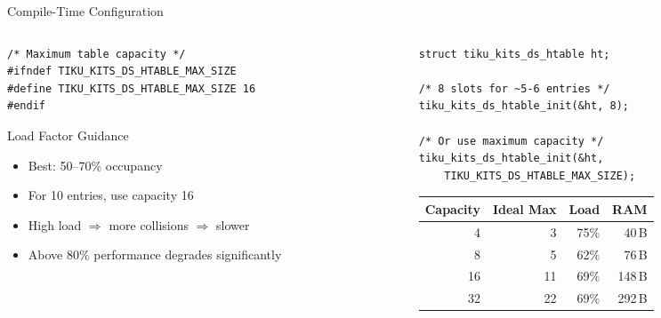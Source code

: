 \documentclass[aspectratio=169, 10pt]{beamer}
\begin{document}
\begin{frame}[fragile]{Compile-Time Configuration}
\begin{columns}[T]
\begin{column}{0.48\textwidth}
\begin{lstlisting}[style=cstyle,
  title={Configurable parameters}]
/* Maximum table capacity */
#ifndef TIKU_KITS_DS_HTABLE_MAX_SIZE
#define TIKU_KITS_DS_HTABLE_MAX_SIZE 16
#endif
\end{lstlisting}

\vspace{0.3em}
\begin{block}{Load Factor Guidance}
\begin{itemize}
  \item Best: 50--70\% occupancy
  \item For 10 entries, use capacity 16
  \item High load $\Rightarrow$ more collisions $\Rightarrow$ slower
  \item Above 80\% performance degrades significantly
\end{itemize}
\end{block}
\end{column}

\begin{column}{0.48\textwidth}
\begin{lstlisting}[style=cstyle,
  title={Runtime initialization}]
struct tiku_kits_ds_htable ht;

/* 8 slots for ~5-6 entries */
tiku_kits_ds_htable_init(&ht, 8);

/* Or use maximum capacity */
tiku_kits_ds_htable_init(&ht,
    TIKU_KITS_DS_HTABLE_MAX_SIZE);
\end{lstlisting}

\vspace{0.3em}
\begin{table}
\centering
\scriptsize
\begin{tabular}{@{}rrrr@{}}
\toprule
\textbf{Capacity} & \textbf{Ideal Max} & \textbf{Load} & \textbf{RAM} \\
\midrule
4  & 3   & 75\%  & 40\,B \\
8  & 5   & 62\%  & 76\,B \\
16 & 11  & 69\%  & 148\,B \\
32 & 22  & 69\%  & 292\,B \\
\bottomrule
\end{tabular}
\end{table}
\end{column}
\end{columns}
\end{frame}
\end{document}
